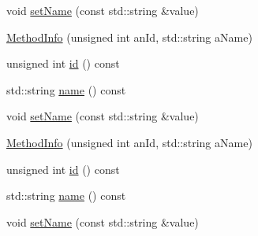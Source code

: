 \begin{DoxyCompactItemize}
\item 
void \mbox{\hyperlink{structfakeit_1_1MethodInfo_a77e8fe8e88ba1c84dfa8d45d74b5e854}{set\+Name}} (const std\+::string \&value)
\item 
\mbox{\hyperlink{structfakeit_1_1MethodInfo_a55bde4b21f0b316f2f01d7e76cee5890}{Method\+Info}} (unsigned int an\+Id, std\+::string a\+Name)
\item 
unsigned int \mbox{\hyperlink{structfakeit_1_1MethodInfo_a013ce0b5f78a9ca29bfb383d49cefb2a}{id}} () const
\item 
std\+::string \mbox{\hyperlink{structfakeit_1_1MethodInfo_ab27987f3bbd7fee8e4762323b333cb27}{name}} () const
\item 
void \mbox{\hyperlink{structfakeit_1_1MethodInfo_a77e8fe8e88ba1c84dfa8d45d74b5e854}{set\+Name}} (const std\+::string \&value)
\item 
\mbox{\hyperlink{structfakeit_1_1MethodInfo_a55bde4b21f0b316f2f01d7e76cee5890}{Method\+Info}} (unsigned int an\+Id, std\+::string a\+Name)
\item 
unsigned int \mbox{\hyperlink{structfakeit_1_1MethodInfo_a013ce0b5f78a9ca29bfb383d49cefb2a}{id}} () const
\item 
std\+::string \mbox{\hyperlink{structfakeit_1_1MethodInfo_ab27987f3bbd7fee8e4762323b333cb27}{name}} () const
\item 
void \mbox{\hyperlink{structfakeit_1_1MethodInfo_a77e8fe8e88ba1c84dfa8d45d74b5e854}{set\+Name}} (const std\+::string \&value)
\end{DoxyCompactItemize}
